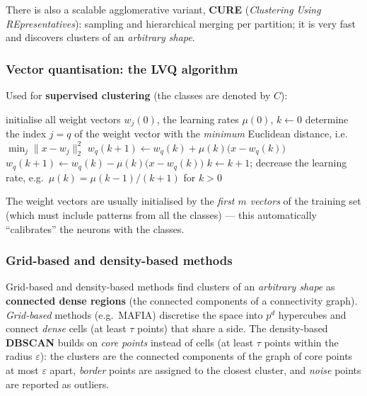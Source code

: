 \documentclass[11pt,a4paper]{article}
\theoremstyle{definition}
\providecommand{\uv}[1]{``#1''}
\begin{document}
There is also a scalable agglomerative variant, \textbf{CURE} (\emph{Clustering Using
REpresentatives}): sampling and hierarchical merging per partition; it is very fast and
discovers clusters of an \emph{arbitrary shape}.

\subsubsection{Vector quantisation: the LVQ algorithm}

\begin{defbox}
Used for \textbf{supervised clustering} (the classes are denoted by $C$):
\begin{algorithmic}[1]
\State initialise all weight vectors $w_j(0)$, the learning rates $\mu(0)$, $k\gets 0$
     \State determine the index $j=q$ of the weight vector with the \emph{minimum} Euclidean
            distance, i.e.\ $\min_j\|x-w_j\|_2^2$
        \State $w_q(k+1)\gets w_q(k)+\mu(k)\big(x-w_q(k)\big)$ 
     \Else
        \State $w_q(k+1)\gets w_q(k)-\mu(k)\big(x-w_q(k)\big)$ 
     \EndIf
  \EndFor
  \State $k\gets k+1$; decrease the learning rate, e.g.\ $\mu(k)=\mu(k-1)/(k+1)$ for $k>0$
\EndWhile
\end{algorithmic}
The weight vectors are usually initialised by the \emph{first $m$ vectors} of the training set
(which must include patterns from all the classes) --- this automatically \uv{calibrates} the
neurons with the classes.
\end{defbox}

\subsubsection{Grid-based and density-based methods}

Grid-based and density-based methods find clusters of an \emph{arbitrary shape} as
\textbf{connected dense regions} (the connected components of a connectivity graph).
\emph{Grid-based} methods (e.g.\ MAFIA) discretise the space into $p^d$ hypercubes and connect
\emph{dense} cells (at least $\tau$ points) that share a side. The density-based
\textbf{DBSCAN} builds on \emph{core points} instead of cells (at least $\tau$ points within
the radius $\varepsilon$): the clusters are the connected components of the graph of core
points at most $\varepsilon$ apart, \emph{border} points are assigned to the closest cluster,
and \emph{noise} points are reported as outliers.
\end{document}
